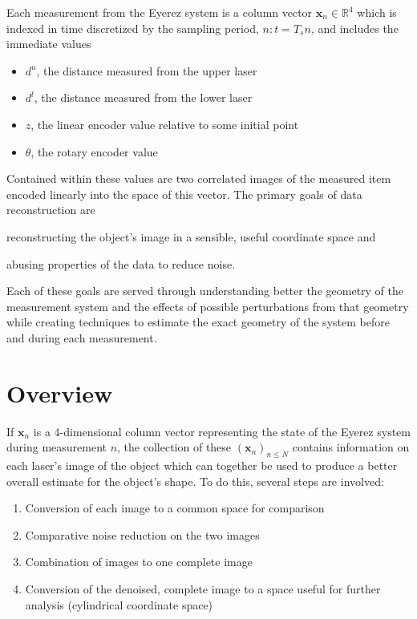 
Each measurement from the Eyerez system is a column vector $
\mathbf{x}_{n} \in \mathbb{R}^{4}$ which is indexed in time
discretized by the sampling period, $n : t = T_{s} n$, and includes
the immediate values

\begin{itemize}
\item $d^{u}$, the distance measured from the upper laser
\item $d^{l}$, the distance measured from the lower laser
\item $z$, the linear encoder value relative to some initial point
\item $\theta$, the rotary encoder value
\end{itemize}

Contained within these values are two correlated images of the
measured item encoded linearly into the space of this vector. The
primary goals of data reconstruction are
\begin{inparaenum}
\item reconstructing the object's image in a sensible, useful
  coordinate space and
\item abusing properties of the data to reduce noise.
\end{inparaenum}

Each of these goals are served through understanding better the
geometry of the measurement system and the effects of possible
perturbations from that geometry while creating techniques to estimate
the exact geometry of the system before and during each measurement.

\section{Overview}
\label{sec:registration-overview}

If $\mathbf{x}_{n}$ is a 4-dimensional column vector representing the
state of the Eyerez system during measurement $n$, the collection of
these $(\mathbf{x}_{n})_{n \leq N}$ contains information on each
laser's image of the object which can together be used to produce a
better overall estimate for the object's shape. To do this, several
steps are involved:

\begin{enumerate}
\item Conversion of each image to a common space for comparison
\item Comparative noise reduction on the two images
\item Combination of images to one complete image
\item Conversion of the denoised, complete image to a space useful for further
  analysis (cylindrical coordinate space)
\end{enumerate}

